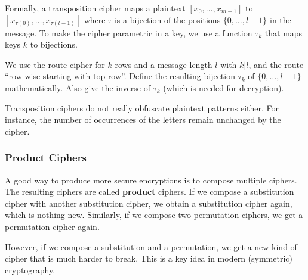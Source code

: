 Formally, a transposition cipher maps a plaintext $[x_0,\ldots,x_{m-1}]$ to $[x_{\tau(0)},\ldots,x_{\tau(l-1)}]$ where $\tau$ is a bijection of the positions $\{0,\ldots,l-1\}$ in the message.
To make the cipher parametric in a key, we use a function $\tau_k$ that maps keys $k$ to bijections.

\begin{exercise}\label{exc:sd:route}
We use the route cipher for $k$ rows and a message length $l$ with $k|l$, and the route ``row-wise starting with top row''.
Define the resulting bijection $\tau_k$ of $\{0,\ldots,l-1\}$ mathematically.
Also give the inverse of $\tau_k$ (which is needed for decryption).
\end{exercise}

Transposition ciphers do not really obfuscate plaintext patterns either.
For instance, the number of occurrences of the letters remain unchanged by the cipher.

\subsubsection{Product Ciphers}
 
A good way to produce more secure encryptions is to compose multiple ciphers.
The resulting ciphers are called \textbf{product} ciphers.
If we compose a substitution cipher with another substitution cipher, we obtain a substitution cipher again, which is nothing new.
Similarly, if we compose two permutation ciphers, we get a permutation cipher again.

However, if we compose a substitution and a permutation, we get a new kind of cipher that is much harder to break.
This is a key idea in modern (symmetric) cryptography. 
